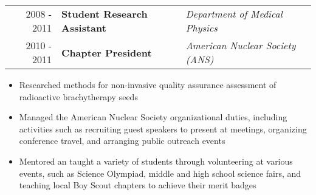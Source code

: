 \begin{minipage}{\textwidth}
\begin{itemize}
	\end{itemize}
\end{minipage}


\begin{minipage}{\textwidth}
		\begin{tabular}{rll}
			2008 - 2011 & \textbf{Student Research Assistant} & \textit{Department of Medical Physics} \\
			2010 - 2011 & \textbf{Chapter President} & \textit{American Nuclear Society (ANS)} \\
		\end{tabular}
\end{minipage}

\begin{minipage}{\textwidth}
	\begin{itemize}
		\item Researched methods for non-invasive quality assurance assessment of radioactive brachytherapy seeds
		\item Managed the American Nuclear Society organizational duties, including activities such as recruiting guest speakers to present at meetings,
			organizing conference travel, and arranging public outreach events
		\item Mentored an taught a variety of students through volunteering at various events, such as Science Olympiad, middle and 
			high school science fairs, and teaching local Boy Scout chapters to achieve their merit badges
	\end{itemize}
\end{minipage}
